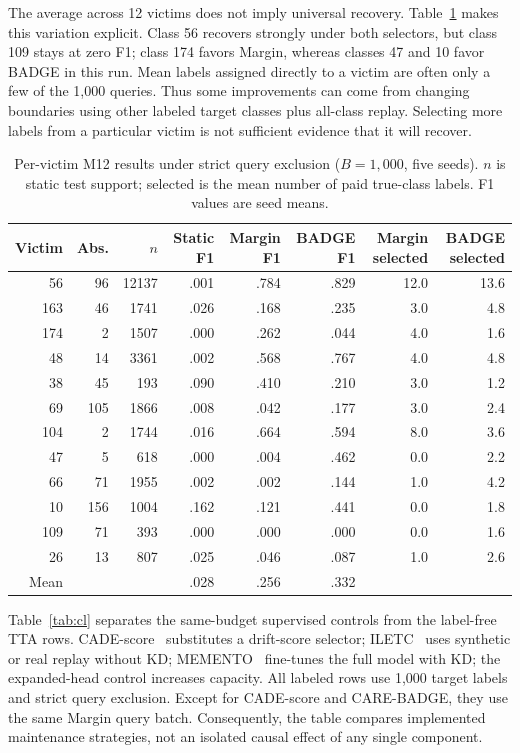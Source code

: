 \documentclass[journal]{IEEEtran}
\newcommand{\ours}{CARE}
\begin{document}
The average across 12 victims does not imply universal recovery. Table~\ref{tab:classrecovery} makes this variation explicit. Class 56 recovers strongly under both selectors, but class 109 stays at zero F1; class 174 favors Margin, whereas classes 47 and 10 favor BADGE in this run. Mean labels assigned directly to a victim are often only a few of the 1,000 queries. Thus some improvements can come from changing boundaries using other labeled target classes plus all-class replay. Selecting more labels from a particular victim is not sufficient evidence that it will recover.

\begin{table}[!t]
\centering
\caption{Per-victim M12 results under strict query exclusion ($B=1{,}000$, five seeds). $n$ is static test support; selected is the mean number of paid true-class labels. F1 values are seed means.}
\label{tab:classrecovery}
\scriptsize
\setlength{\tabcolsep}{3.8pt}
\begin{tabular}{@{}rrrrrrrr@{}}
\toprule
Victim & Abs. & $n$ & Static F1 & Margin F1 & BADGE F1 & Margin selected & BADGE selected\\
\midrule
56  & 96  & 12137 & .001 & .784 & .829 & 12.0 & 13.6\\
163 & 46  & 1741  & .026 & .168 & .235 & 3.0 & 4.8\\
174 & 2   & 1507  & .000 & .262 & .044 & 4.0 & 1.6\\
48  & 14  & 3361  & .002 & .568 & .767 & 4.0 & 4.8\\
38  & 45  & 193   & .090 & .410 & .210 & 3.0 & 1.2\\
69  & 105 & 1866  & .008 & .042 & .177 & 3.0 & 2.4\\
104 & 2   & 1744  & .016 & .664 & .594 & 8.0 & 3.6\\
47  & 5   & 618   & .000 & .004 & .462 & 0.0 & 2.2\\
66  & 71  & 1955  & .002 & .002 & .144 & 1.0 & 4.2\\
10  & 156 & 1004  & .162 & .121 & .441 & 0.0 & 1.8\\
109 & 71  & 393   & .000 & .000 & .000 & 0.0 & 1.6\\
26  & 13  & 807   & .025 & .046 & .087 & 1.0 & 2.6\\
\midrule
Mean & & & .028 & .256 & .332 & & \\
\bottomrule
\end{tabular}
\end{table}

Table~\ref{tab:cl} separates the same-budget supervised controls from the label-free TTA rows. CADE-score~\cite{yang2021cade} substitutes a drift-score selector; ILETC~\cite{zhu2023iletc} uses synthetic or real replay without KD; MEMENTO~\cite{cerasuolo2024memento} fine-tunes the full model with KD; the expanded-head control increases capacity. All labeled rows use 1,000 target labels and strict query exclusion. Except for CADE-score and \ours{}-BADGE, they use the same Margin query batch. Consequently, the table compares implemented maintenance strategies, not an isolated causal effect of any single component.
\end{document}
